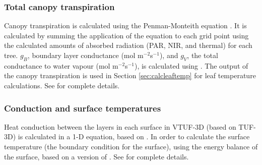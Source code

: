 \documentclass[preprint,12pt,authoryear]{elsarticle}
\begin{document}
\subsubsection{Total canopy transpiration}\label{sec:totalcanopy}

Canopy transpiration is calculated using the Penman-Monteith equation \citep{Penman1948,Monteith1965}. It is calculated by summing the application of the equation to each grid point using the calculated amounts of absorbed radiation (PAR, NIR, and thermal) for each tree. $g_{B}$, boundary layer conductance (mol m$^{-2}$s$^{-1}$), and $g_{V}$, the total conductance to water vapour (mol m$^{-2}$s$^{-1}$), is calculated using \cite{Jones1992}. The output of the canopy transpiration is used in Section \ref{sec:calcleaftemp} for leaf temperature calculations. See \cite{Duursma2012} for complete details.

%
%
%



\subsubsection{Conduction and surface temperatures}

Heat conduction between the layers in each surface in VTUF-3D (based on TUF-3D) is calculated in a 1-D equation, based on \cite{Masson2000}. In order to calculate the surface temperature (the boundary condition for the surface), using the energy balance of the surface, based on a version of \cite{Arnfield1990}. See \cite{Krayenhoff2007} for complete details.
\end{document}
